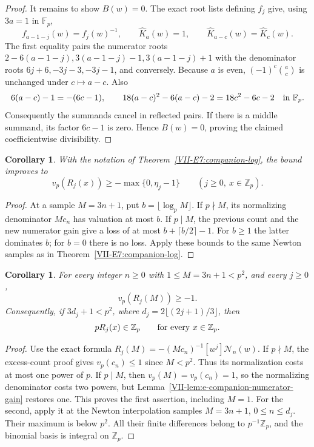 \documentclass[11pt,letterpaper]{article}
\newtheorem{corollary}[theorem]{Corollary}
\numberwithin{equation}{section}
\begin{document}
\begin{proof}
It remains to show $B(w)=0$. The exact root lists defining $f_j$
give, using $3a=1$ in $\mathbb F_p$,
\[
 f_{a-1-j}(w)=f_j(w)^{-1},\qquad
 \widehat K_a(w)=1,\qquad
 \widehat K_{a-c}(w)=\widehat K_c(w).
\]
The first equality pairs the numerator roots
$2-6(a-1-j),3(a-1-j)-1,3(a-1-j)+1$
with the denominator roots $6j+6,-3j-3,-3j-1$, and conversely.
Because $a$ is even, $(-1)^c\binom ac$ is unchanged under
$c\mapsto a-c$. Also
\[
 6(a-c)-1=-(6c-1),\qquad
 18(a-c)^2-6(a-c)-2=18c^2-6c-2
 \quad\hbox{in }\mathbb F_p.
\]
Consequently the summands cancel in reflected pairs. If there is a
middle summand, its factor $6c-1$ is zero. Hence $B(w)=0$, proving
the claimed coefficientwise divisibility.
\end{proof}

\begin{corollary}\label{VII-cor:e-companion-improved-log}
With the notation of Theorem~\ref{VII-E7:companion-log}, the bound improves to
\[
 v_p(R_j(x))\ge-\max\{0,\eta_j-1\}
 \qquad(j\ge0,\ x\in\mathbb Z_p).
\]
\end{corollary}
\begin{proof}
At a sample $M=3n+1$, put $b=\lfloor\log_p M\rfloor$.
If $p\nmid M$, its normalizing denominator $Mc_n$ has valuation
at most $b$. If $p\mid M$, the previous count and the new numerator
gain give a loss of at most $b+\lceil b/2\rceil-1$.
For $b\ge1$ the latter dominates $b$; for $b=0$ there is no loss.
Apply these bounds to the same Newton samples as in
Theorem~\ref{VII-E7:companion-log}.
\end{proof}

\begin{corollary}\label{VII-cor:e-companion-short-sample}
For every integer $n\ge0$ with $1\le M=3n+1<p^2$, and every $j\ge0$,
\[
 v_p(R_j(M))\ge-1.
\]
Consequently, if $3d_j+1<p^2$, where
$d_j=2\lfloor(2j+1)/3\rfloor$, then
\[
 pR_j(x)\in\mathbb Z_p\qquad\hbox{for every }x\in\mathbb Z_p.
\]
\end{corollary}
\begin{proof}
Use the exact formula
$R_j(M)=-(Mc_n)^{-1}[w^j]\mathcal N_n(w)$.
If $p\nmid M$, the excess-count proof gives $v_p(c_n)\le1$
since $M<p^2$. Thus its normalization costs at most one power of $p$.
If $p\mid M$, then $v_p(M)=v_p(c_n)=1$, so the normalizing
denominator costs two powers, but
Lemma~\ref{VII-lem:e-companion-numerator-gain} restores one.
This proves the first assertion, including $M=1$.
For the second, apply it at the Newton interpolation samples
$M=3n+1$, $0\le n\le d_j$. Their maximum is below $p^2$.
All their finite differences belong to $p^{-1}\mathbb Z_p$,
and the binomial basis is integral on $\mathbb Z_p$.
\end{proof}
\end{document}

